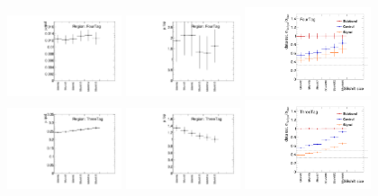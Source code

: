 \begin{figure}[htbp!]
\begin{center}
\includegraphics[width=0.3\textwidth,angle=-90]{figures/boosted/Appendix_SB/FourTag_muqcdSBshift.pdf}
\includegraphics[width=0.3\textwidth,angle=-90]{figures/boosted/Appendix_SB/FourTag_mutopSBshift.pdf}
\includegraphics[width=0.33\textwidth,angle=-90]{figures/boosted/Appendix_SB/data_est_FourTag_sigma_compareSBshift.pdf}\\
\includegraphics[width=0.3\textwidth,angle=-90]{figures/boosted/Appendix_SB/ThreeTag_muqcdSBshift.pdf}
\includegraphics[width=0.3\textwidth,angle=-90]{figures/boosted/Appendix_SB/ThreeTag_mutopSBshift.pdf}
\includegraphics[width=0.33\textwidth,angle=-90]{figures/boosted/Appendix_SB/data_est_ThreeTag_sigma_compareSBshift.pdf}\\

\end{center}
\end{figure}
